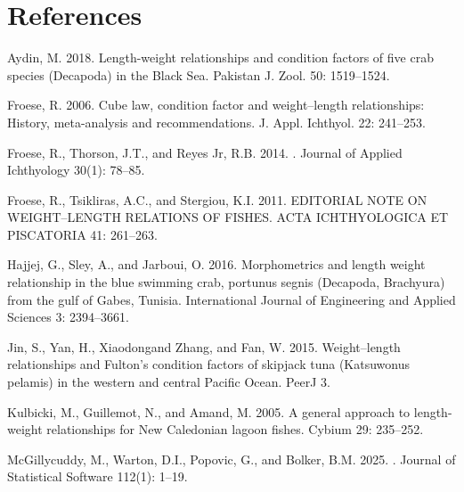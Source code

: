 \documentclass[12pt]{article}\usepackage[]{graphicx}\usepackage[]{color}
\begin{document}
\clearpage

\section{References}\label{references}

\noindent \vspace{-2em} \setlength{\parindent}{-0.2in} \setlength{\leftskip}{0.2in} \setlength{\parskip}{8pt}

\protect{}\label{refs}
\begin{CSLReferences}{1}{0}
Aydin, M. 2018. Length-weight relationships and condition factors of five crab species ({D}ecapoda) in the {B}lack {S}ea. Pakistan J. Zool. 50: 1519--1524.

Froese, R. 2006. Cube law, condition factor and weight--length relationships: History, meta-analysis and recommendations. J. Appl. Ichthyol. 22: 241--253.

Froese, R., Thorson, J.T., and Reyes Jr, R.B. 2014. . Journal of Applied Ichthyology 30(1): 78--85.

Froese, R., Tsikliras, A.C., and Stergiou, K.I. 2011. EDITORIAL NOTE ON WEIGHT--LENGTH RELATIONS OF FISHES. ACTA ICHTHYOLOGICA ET PISCATORIA 41: 261--263.

Hajjej, G., Sley, A., and Jarboui, O. 2016. Morphometrics and length weight relationship in the blue swimming crab, portunus segnis ({D}ecapoda, {B}rachyura) from the gulf of {G}abes, {T}unisia. International Journal of Engineering and Applied Sciences 3: 2394--3661.

Jin, S., Yan, H., Xiaodongand Zhang, and Fan, W. 2015. Weight--length relationships and {F}ulton's condition factors of skipjack tuna ({K}atsuwonus pelamis) in the western and central {P}acific {O}cean. PeerJ 3.

Kulbicki, M., Guillemot, N., and Amand, M. 2005. A general approach to length-weight relationships for {N}ew {C}aledonian lagoon fishes. Cybium 29: 235--252.

McGillycuddy, M., Warton, D.I., Popovic, G., and Bolker, B.M. 2025. . Journal of Statistical Software 112(1): 1--19.


\end{CSLReferences}
\end{document}
